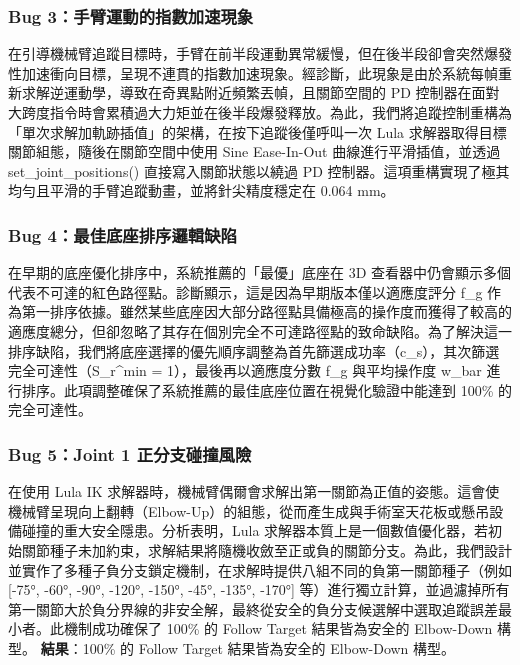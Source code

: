 \documentclass[a4paper, 12pt]{article}
\begin{document}
\subsubsection{Bug 3：手臂運動的指數加速現象}

在引導機械臂追蹤目標時，手臂在前半段運動異常緩慢，但在後半段卻會突然爆發性加速衝向目標，呈現不連貫的指數加速現象。經診斷，此現象是由於系統每幀重新求解逆運動學，導致在奇異點附近頻繁丟幀，且關節空間的 PD 控制器在面對大跨度指令時會累積過大力矩並在後半段爆發釋放。為此，我們將追蹤控制重構為「單次求解加軌跡插值」的架構，在按下追蹤後僅呼叫一次 Lula 求解器取得目標關節組態，隨後在關節空間中使用 Sine Ease-In-Out 曲線進行平滑插值，並透過 set\_joint\_positions() 直接寫入關節狀態以繞過 PD 控制器。這項重構實現了極其均勻且平滑的手臂追蹤動畫，並將針尖精度穩定在 0.064 mm。

\subsubsection{Bug 4：最佳底座排序邏輯缺陷}

在早期的底座優化排序中，系統推薦的「最優」底座在 3D 查看器中仍會顯示多個代表不可達的紅色路徑點。診斷顯示，這是因為早期版本僅以適應度評分 f\_g 作為第一排序依據。雖然某些底座因大部分路徑點具備極高的操作度而獲得了較高的適應度總分，但卻忽略了其存在個別完全不可達路徑點的致命缺陷。為了解決這一排序缺陷，我們將底座選擇的優先順序調整為首先篩選成功率（c\_s），其次篩選完全可達性（S\_r\^{}min = 1），最後再以適應度分數 f\_g 與平均操作度 w\_bar 進行排序。此項調整確保了系統推薦的最佳底座位置在視覺化驗證中能達到 100\% 的完全可達性。

\subsubsection{Bug 5：Joint 1 正分支碰撞風險}

在使用 Lula IK 求解器時，機械臂偶爾會求解出第一關節為正值的姿態。這會使機械臂呈現向上翻轉（Elbow-Up）的組態，從而產生成與手術室天花板或懸吊設備碰撞的重大安全隱患。分析表明，Lula 求解器本質上是一個數值優化器，若初始關節種子未加約束，求解結果將隨機收斂至正或負的關節分支。為此，我們設計並實作了多種子負分支鎖定機制，在求解時提供八組不同的負第一關節種子（例如 [-75°, -60°, -90°, -120°, -150°, -45°, -135°, -170°] 等）進行獨立計算，並過濾掉所有第一關節大於負分界線的非安全解，最終從安全的負分支候選解中選取追蹤誤差最小者。此機制成功確保了 100\% 的 Follow Target 結果皆為安全的 Elbow-Down 構型。
\textbf{結果}：100\% 的 Follow Target 結果皆為安全的 Elbow-Down 構型。
\end{document}
